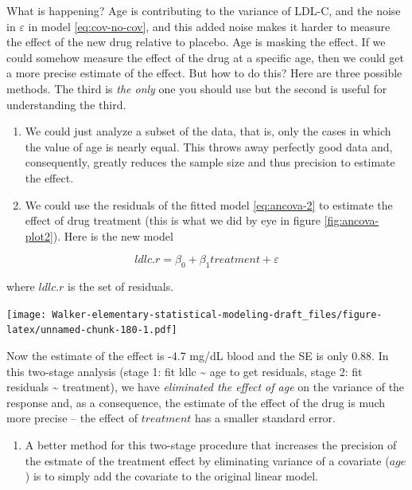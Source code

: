 \documentclass[]{book}
\providecommand{\tightlist}{%
  \setlength{\itemsep}{0pt}\setlength{\parskip}{0pt}}
\begin{document}
What is happening? Age is contributing to the variance of LDL-C, and the noise in \(\varepsilon\) in model \eqref{eq:cov-no-cov}, and this added noise makes it harder to measure the effect of the new drug relative to placebo. Age is masking the effect. If we could somehow measure the effect of the drug at a specific age, then we could get a more precise estimate of the effect. But how to do this? Here are three possible methods. The third is \emph{the only} one you should use but the second is useful for understanding the third.

\begin{enumerate}
\def\labelenumi{\arabic{enumi}.}
\item
  We could just analyze a subset of the data, that is, only the cases in which the value of age is nearly equal. This throws away perfectly good data and, consequently, greatly reduces the sample size and thus precision to estimate the effect.
\item
  We could use the residuals of the fitted model \eqref{eq:ancova-2} to estimate the effect of drug treatment (this is what we did by eye in figure \ref{fig:ancova-plot2}). Here is the new model
\end{enumerate}

\begin{equation}
ldlc.r = \beta_0 + \beta_1 treatment + \varepsilon
\label{eq:ancova-3}
\end{equation}

where \(ldlc.r\) is the set of residuals.

\texttt{[image: Walker-elementary-statistical-modeling-draft\_files/figure-latex/unnamed-chunk-180-1.pdf]}

Now the estimate of the effect is -4.7 mg/dL blood and the SE is only 0.88. In this two-stage analysis (stage 1: fit ldlc \textasciitilde{} age to get residuals, stage 2: fit residuals \textasciitilde{} treatment), we have \emph{eliminated the effect of age} on the variance of the response and, as a consequence, the estimate of the effect of the drug is much more precise -- the effect of \(treatment\) has a smaller standard error.

\begin{enumerate}
\def\labelenumi{\arabic{enumi}.}
\setcounter{enumi}{2}
\tightlist
\item
  A better method for this two-stage procedure that increases the precision of the estmate of the treatment effect by eliminating variance of a covariate (\(age\)) is to simply add the covariate to the original linear model.
\end{enumerate}
\end{document}
